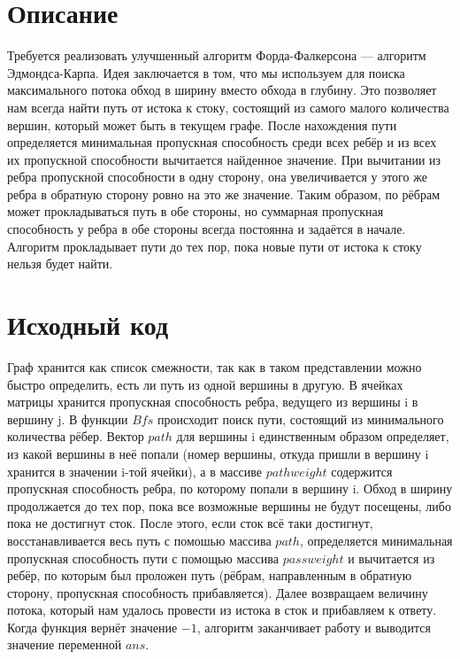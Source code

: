 \section{Описание}
Требуется реализовать улучшенный алгоритм Форда-Фалкерсона — алгоритм Эдмондса-Карпа. Идея заключается в том, что мы используем для поиска максимального потока обход в ширину вместо обхода в глубину. Это позволяет нам всегда найти путь от истока к стоку, состоящий из самого малого количества вершин, который может быть в текущем графе. После нахождения пути определяется минимальная пропускная способность среди всех ребёр и из всех их пропускной способности вычитается найденное значение. При вычитании из ребра пропускной способности в одну сторону, она увеличивается у этого же ребра в обратную сторону ровно на это же значение. Таким образом, по рёбрам может прокладываться путь в обе стороны, но суммарная пропускная способность у ребра в обе стороны всегда постоянна и задаётся в начале. Алгоритм прокладывает пути до тех пор, пока новые пути от истока к стоку нельзя будет найти.

\pagebreak

\section{Исходный код}
Граф хранится как список смежности, так как в таком представлении можно быстро определить, есть ли путь из одной вершины в другую. В ячейках матрицы хранится пропускная способность ребра, ведущего из вершины i в вершину j. В функции $Bfs$ происходит поиск пути, состоящий из минимального количества рёбер. Вектор $path$ для вершины i единственным образом определяет, из какой вершины в неё попали (номер вершины, откуда пришли в вершину i хранится в значении i-той ячейки), а в массиве $path$\textunderscore$weight$ содержится пропускная способность ребра, по которому попали в вершину i. Обход в ширину продолжается до тех пор, пока все возможные вершины не будут посещены, либо пока не достигнут сток. После этого, если сток всё таки достигнут, восстанавливается весь путь с помошью массива $path$, определяется минимальная пропускная способность пути с помощью массива $pass$\textunderscore$weight$ и вычитается из ребёр, по которым был проложен путь (рёбрам, направленным в обратную сторону, пропускная способность прибавляется). Далее возвращаем величину потока, который нам удалось провести из истока в сток и прибавляем к ответу. Когда функция вернёт значение $-1$, алгоритм заканчивает работу и выводится значение переменной $ans$.

